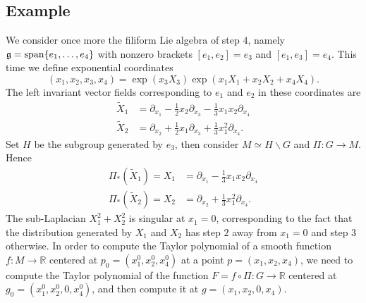 \documentclass[12pt]{amsart}
\begin{document}
\subsection{Example}
We consider once more the filiform Lie algebra of step $4$, namely $\mathfrak{g}={\rm span}\{e_1,\dots,e_4\}$ with nonzero brackets $[e_1,e_2]=e_3$ and $[e_1,e_3]=e_4$. This time we define exponential coordinates
$$
(x_1,x_2,x_3,x_4) =\exp\left(x_3X_3 \right)\exp\left(x_1X_1+x_2X_2+x_4X_4 \right).
$$
The left invariant vector fields corresponding to $e_1$ and $e_2$ in these coordinates are
\begin{align*}
    \tilde X_1 &= \partial_{x_1}-\frac{1}{2}x_2\partial_{x_3}-\frac{1}{3}x_1x_2\partial_{x_4}\\
    \tilde X_2 &= \partial_{x_2}+\frac{1}{2}x_1\partial_{x_3}+\frac{1}{3}x_1^2\partial_{x_4}.
\end{align*}
Set $H$ be the subgroup generated by $e_3$, then consider $M\simeq H\backslash G$ and $\Pi:G\to M$. Hence
\begin{align*}
\Pi_*(\tilde X_1)=X_1 &= \partial_{x_1}-\frac{1}{3}x_1x_2\partial_{x_4}\\
   \Pi_*(\tilde X_2)=  X_2&=\partial_{x_2}+\frac{1}{3}x_1^2\partial_{x_4}.
\end{align*}
The sub-Laplacian $X_1^2+X_2^2$ is singular at $x_1=0$, corresponding to the fact that the distribution generated by $X_1$ and $X_2$ has step $2$ away from $x_1=0$ and step $3$ otherwise. In order to compute the Taylor polynomial of a smooth function $f:M\to \mathbb R$ centered at $p_0=(x_1^0,x_2^0,x_4^0)$ at a point $p=(x_1,x_2,x_4)$, we need to compute the Taylor polynomial of the function $F=f\circ \Pi:G\to \mathbb R$ centered at $g_0=(x_1^0,x_2^0,0,x_4^0)$, and then compute it at $g=(x_1,x_2,0,x_4)$.
\end{document}
